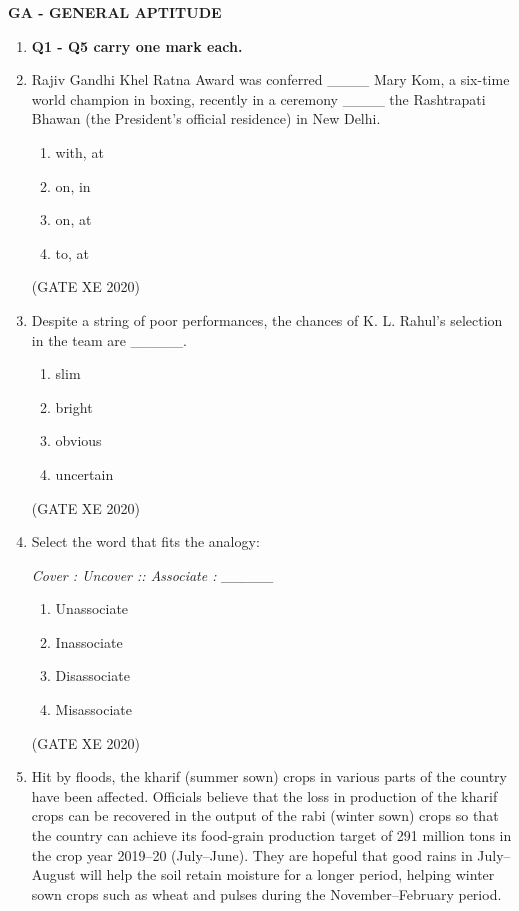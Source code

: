 \documentclass[12pt]{article}
\begin{document}
\begin{center}
    {\large \textbf{GA - GENERAL APTITUDE}}
\end{center}



\begin{enumerate}

\item[] \textbf{Q1 - Q5 carry one mark each.}

\item Rajiv Gandhi Khel Ratna Award was conferred \_\_\_\_ Mary Kom, a six-time world champion in boxing, recently in a ceremony \_\_\_\_ the Rashtrapati Bhawan (the President’s official residence) in New Delhi.

\begin{enumerate}
\item with, at
\item on, in
\item on, at
\item to, at
\end{enumerate}
(GATE XE 2020)

\item Despite a string of poor performances, the chances of K. L. Rahul’s selection in the team are \_\_\_\_\_.

\begin{enumerate}
\item slim
\item bright
\item obvious
\item uncertain
\end{enumerate}
(GATE XE 2020)

\item Select the word that fits the analogy:

\textit{Cover : Uncover :: Associate : \_\_\_\_\_}

\begin{enumerate}
\item Unassociate
\item Inassociate
\item Disassociate
\item Misassociate
\end{enumerate}
(GATE XE 2020)

\item Hit by floods, the kharif (summer sown) crops in various parts of the country have been affected. Officials believe that the loss in production of the kharif crops can be recovered in the output of the rabi (winter sown) crops so that the country can achieve its food-grain production target of 291 million tons in the crop year 2019--20 (July--June). They are hopeful that good rains in July--August will help the soil retain moisture for a longer period, helping winter sown crops such as wheat and pulses during the November--February period.  


\end{enumerate}
\end{document}
